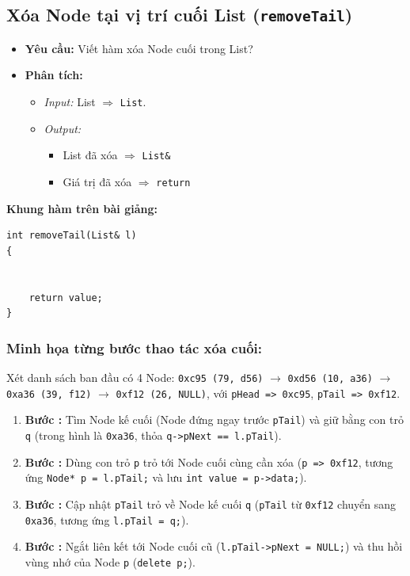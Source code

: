 \documentclass[12pt,a4paper]{article}
\begin{document}
\subsection{Xóa Node tại vị trí cuối List (\texttt{removeTail})}
\begin{itemize}[itemsep=0.15em]
    \item \textbf{Yêu cầu:} Viết hàm xóa Node cuối trong List?
    \item \textbf{Phân tích:}
    \begin{itemize}
        \item \textit{Input:} List $\Rightarrow$ \texttt{List}.
        \item \textit{Output:}
        \begin{itemize}
            \item List đã xóa $\Rightarrow$ \texttt{List\&}
            \item Giá trị đã xóa $\Rightarrow$ \texttt{return}
        \end{itemize}
    \end{itemize}
\end{itemize}
\textbf{Khung hàm trên bài giảng:}
\begin{lstlisting}
int removeTail(List& l)
{


    return value;
}
\end{lstlisting}

\subsubsection*{Minh họa từng bước thao tác xóa cuối:}
Xét danh sách ban đầu có 4 Node: \texttt{0xc95 (79, d56)} $\rightarrow$ \texttt{0xd56 (10, a36)} $\rightarrow$ \texttt{0xa36 (39, f12)} $\rightarrow$ \texttt{0xf12 (26, NULL)}, với \texttt{pHead => 0xc95}, \texttt{pTail => 0xf12}.
\begin{enumerate}[itemsep=0.2em]
    \item \textbf{Bước :} Tìm Node kế cuối (Node đứng ngay trước \texttt{pTail}) và giữ bằng con trỏ \texttt{q} (trong hình là \texttt{0xa36}, thỏa \texttt{q->pNext == l.pTail}).
    \item \textbf{Bước :} Dùng con trỏ \texttt{p} trỏ tới Node cuối cùng cần xóa (\texttt{p => 0xf12}, tương ứng \texttt{Node* p = l.pTail;} và lưu \texttt{int value = p->data;}).
    \item \textbf{Bước :} Cập nhật \texttt{pTail} trỏ về Node kế cuối \texttt{q} (\texttt{pTail} từ \texttt{0xf12} chuyển sang \texttt{0xa36}, tương ứng \texttt{l.pTail = q;}).
    \item \textbf{Bước :} Ngắt liên kết tới Node cuối cũ (\texttt{l.pTail->pNext = NULL;}) và thu hồi vùng nhớ của Node \texttt{p} (\texttt{delete p;}).
\end{enumerate}
\end{document}
